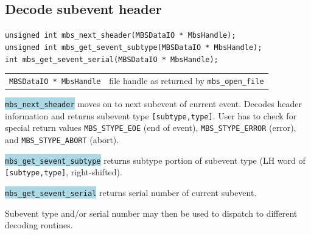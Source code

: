 \documentclass[10pt,a4paper]{article}
\newcommand{\blue}[1]{\colorbox{lightblue}{\texttt{#1}}}
\newenvironment{blueboxed}
	{\begin{Sbox}\begin{minipage}[t]}
	{\end{minipage}\end{Sbox}\colorbox{lightblue}{\TheSbox}}
\begin{document}
\subsection{Decode subevent header}\vspace{3mm}
\begin{center}
\begin{blueboxed}{.8\linewidth}
	\verb+unsigned int mbs_next_sheader(MBSDataIO * MbsHandle);+\\
	\verb+unsigned int mbs_get_sevent_subtype(MBSDataIO * MbsHandle);+\\
	\verb+int mbs_get_sevent_serial(MBSDataIO * MbsHandle);+
\end{blueboxed}
\end{center}
\begin{center}
\begin{tabular}{ll}
\verb+MBSDataIO * MbsHandle+	& file handle as returned by \verb+mbs_open_file+\\
\end{tabular}
\end{center}
\blue{mbs\_next\_sheader} moves on to next subevent of current event.
Decodes header information and returns subevent type \verb+[subtype,type]+.
User has to check for special return values \verb+MBS_STYPE_EOE+ (end of event),
\verb+MBS_STYPE_ERROR+ (error), and \verb+MBS_STYPE_ABORT+ (abort).

\blue{mbs\_get\_sevent\_subtype} returns subtype portion of subevent type (LH word of \verb+[subtype,type]+, right-shifted).

\blue{mbs\_get\_sevent\_serial} returns serial number of current subevent.

Subevent type and/or serial number may then be used to dispatch to different decoding routines.
\vspace{5mm}
\end{document}
